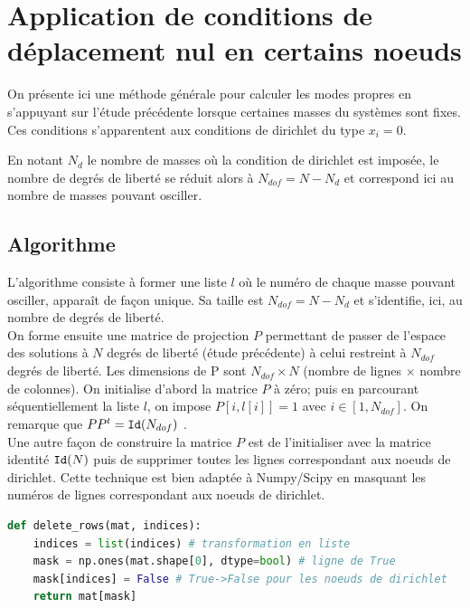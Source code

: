 \documentclass[a4paper, 10pt]{article}
\begin{document}
\section{Application de conditions de déplacement nul en certains noeuds}

On présente ici une méthode générale pour calculer les modes propres en s'appuyant sur
l'étude précédente lorsque certaines masses du systèmes sont fixes.
Ces conditions s'apparentent aux conditions de dirichlet du type $x_i=0$.

En notant $N_d$ le nombre de masses où  la condition de dirichlet est imposée, 
le nombre de degrés de liberté se réduit alors à $N_{dof}=N-N_d$ et correspond 
ici au nombre de masses pouvant osciller.\\

\subsection{Algorithme}
L'algorithme consiste à former une liste $l$ où le numéro de chaque masse pouvant osciller,
apparaît de façon unique. Sa
taille est $N_{dof}=N-N_d$ et s'identifie, ici,  au nombre de degrés de liberté. \\

On forme ensuite une matrice de projection $P$ permettant de passer de l'espace des solutions à $N$ degrés de 
liberté (étude précédente) à celui restreint à $N_{dof}$ degrés de liberté.
Les dimensions de P sont $N_{dof} \times N$ (nombre de lignes $\times$ nombre de colonnes).
On initialise d'abord la matrice $P$ à zéro;
puis en parcourant séquentiellement la liste $l$, on impose $P[i, l[i]]=1$ avec $i \in [1, N_{dof}]$.
On remarque que $P P^t = {\tt Id}(N_{dof})$ .\\

Une autre façon de construire la matrice $P$ est de l'initialiser avec  la matrice identité ${\tt Id}(N)$
puis de supprimer toutes les lignes correspondant aux noeuds de dirichlet. Cette technique
est bien adaptée à Numpy/Scipy en masquant les numéros de lignes correspondant aux noeuds de dirichlet.


\begin{lstlisting}[language=Python]
def delete_rows(mat, indices):
    indices = list(indices) # transformation en liste
    mask = np.ones(mat.shape[0], dtype=bool) # ligne de True
    mask[indices] = False # True->False pour les noeuds de dirichlet
    return mat[mask]
\end{lstlisting}
\end{document}
